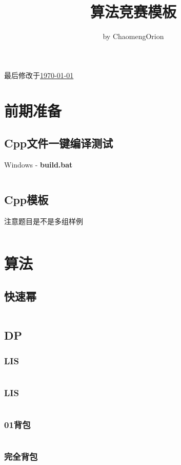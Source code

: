 \documentclass[a4paper, 10pt]{paper}
\newcommand{\cpp}[1]{\inputminted[frame=single, linenos=true]{cpp}{#1}}
\begin{document}
    \title{算法竞赛模板}
    \author{by ChaomengOrion}
    \maketitle
    {\color{cyan}最后修改于\underline{\today}}

    \tableofcontents

    \section{前期准备}
        \subsection{Cpp文件一键编译测试}
        Windows - \textbf{build.bat}
        \inputminted[frame=single, linenos=true]{bat}{../build.bat}

        \subsection{Cpp模板}
        注意题目是不是多组样例
        \cpp{../template.cpp}

    \section{算法}
        \subsection{快速幂}
        \cpp{../快速幂.cpp}

        \subsection{DP}
        \subsubsection{LIS}
        \cpp{../LIS.cpp}
        \subsubsection{LIS}
        \cpp{../LCS.cpp}
        \subsubsection{01背包}
        \cpp{../0_1_背包.cpp}
        \subsubsection{完全背包}
        \cpp{../完全背包.cpp}
\end{document}
